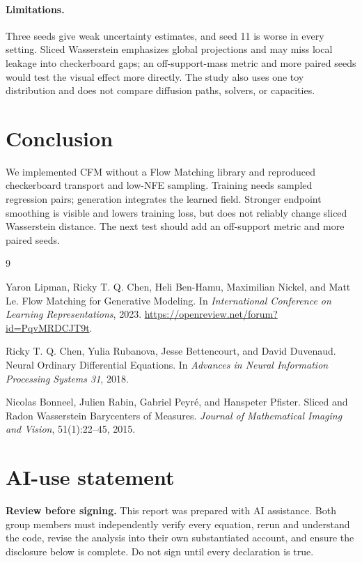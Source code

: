 \documentclass{article}
\begin{document}
\paragraph{Limitations.}
Three seeds give weak uncertainty estimates, and seed 11 is worse in every setting. Sliced Wasserstein emphasizes global projections and may miss local leakage into checkerboard gaps; an off-support-mass metric and more paired seeds would test the visual effect more directly. The study also uses one toy distribution and does not compare diffusion paths, solvers, or capacities.

\section{Conclusion}

We implemented CFM without a Flow Matching library and reproduced checkerboard transport and low-NFE sampling. Training needs sampled regression pairs; generation integrates the learned field. Stronger endpoint smoothing is visible and lowers training loss, but does not reliably change sliced Wasserstein distance. The next test should add an off-support metric and more paired seeds.

\clearpage
\begin{thebibliography}{9}

Yaron Lipman, Ricky T. Q. Chen, Heli Ben-Hamu, Maximilian Nickel, and Matt Le.
\newblock Flow Matching for Generative Modeling.
\newblock In \emph{International Conference on Learning Representations}, 2023.
\newblock \url{https://openreview.net/forum?id=PqvMRDCJT9t}.

Ricky T. Q. Chen, Yulia Rubanova, Jesse Bettencourt, and David Duvenaud.
\newblock Neural Ordinary Differential Equations.
\newblock In \emph{Advances in Neural Information Processing Systems 31}, 2018.

Nicolas Bonneel, Julien Rabin, Gabriel Peyr\'e, and Hanspeter Pfister.
\newblock Sliced and Radon Wasserstein Barycenters of Measures.
\newblock \emph{Journal of Mathematical Imaging and Vision}, 51(1):22--45, 2015.

\end{thebibliography}

\clearpage
\section*{AI-use statement}

\noindent\textbf{Review before signing.} This report was prepared with AI assistance. Both group members must independently verify every equation, rerun and understand the code, revise the analysis into their own substantiated account, and ensure the disclosure below is complete. Do not sign until every declaration is true.
\end{document}
